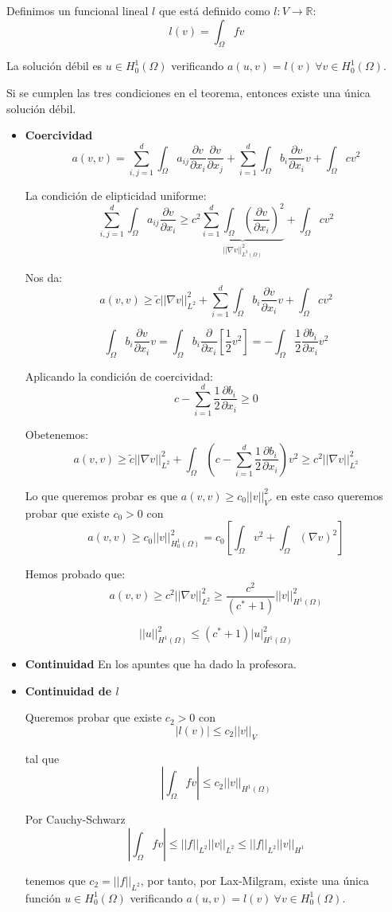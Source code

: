 	Definimos un funcional lineal $l$ que está definido como $l:V\longrightarrow \mathbb{R}$:
	$$l(v) = \int_\Omega fv$$
	
	La solución débil es $u\in H_0^1(\Omega)$ verificando $a(u,v) = l(v) \ \forall v \in H_0^1(\Omega)$.
	
	Si se cumplen las tres condiciones en el teorema, entonces existe una única solución débil.
	
	\begin{itemize}
		\item \textbf{Coercividad}
		$$a(v,v) = \sum_{i,j=1}^d \int_\Omega a_{ij} \frac{\partial v}{\partial x_i} \frac{\partial v}{\partial x_j} + \sum_{i=1}^d\int_\Omega b_i \frac{\partial v}{\partial x_i}v + \int_\Omega cv^2$$
		
		La condición de elipticidad uniforme:
		$$\sum_{i,j=1}^d \int_\Omega a_{ij} \frac{\partial v}{\partial x_i} \ge c^2  \underbrace{\sum_{i=1}^d\int_\Omega (\frac{\partial v}{\partial x_i})^2}_{||\nabla v|| ^2_{L^2(\Omega)}} + \int_\Omega cv^2$$
		
		Nos da:
		$$a(v,v) \ge \tilde{c}||\nabla v||^2_{L^2} + \sum_{i=1}^d \int_{\Omega} b_i\frac{\partial v}{\partial x_i}v + \int_\Omega cv^2$$
		
		$$\int_\Omega b_i\frac{\partial v}{\partial x_i}v = \int_\Omega b_i\frac{\partial }{\partial x_i}\left[\frac{1}{2}v^2\right] = -\int_\Omega \frac{1}{2}\frac{\partial b_i}{\partial x_i} v^2$$
		
		Aplicando la condición de coercividad:
		$$c-\sum_{i=1}^d\frac{1}{2}\frac{\partial b_i}{\partial x_i} \ge 0$$
		
		Obetenemos:
		$$a(v,v) \ge \tilde{c}||\nabla v||^2_{L^2} + \int_\Omega \left(c-\sum_{i=1}^d \frac{1}{2} \frac{\partial b_i}{\partial x_i}\right)v^2 \ge c^2 ||\nabla v||^2_{L^2}$$
		
		Lo que queremos probar es que $a(v,v) \ge c_0 ||v||^2_V$. en este caso queremos probar que existe $c_0>0$ con
		$$a(v,v) \ge c_0 ||v||^2_{H_0^1(\Omega)} = c_0 \left[\int_\Omega v^2 + \int_\Omega (\nabla v)^2\right]$$
		
		Hemos probado que:
		$$a(v,v)\ge c^2 ||\nabla v||^2_{L^2} \ge \frac{c^2}{(c^*+1)}||v||^2_{H^1(\Omega)}$$
		
		$$||u||^2_{H^1(\Omega)}\le (c^*+1)|u|^2_{H^1(\Omega)}$$
		
		\item \textbf{Continuidad}	
		En los apuntes que ha dado la profesora.
		
		\item \textbf{Continuidad de $l$}
		
		Queremos probar que existe $c_2>0$ con
		$$|l(v)| \le c_2||v||_V$$
		
		tal que
		$$|\int_\Omega fv| \le c_2||v||_{H^1(\Omega)}$$
		
		Por Cauchy-Schwarz
		$$|\int_{\Omega} fv| \le ||f||_{L^2} ||v||_{L^2} \le ||f||_{L^2}||v||_{H^1}$$
		
		tenemos que $c_2 = ||f||_{L^2}$, por tanto, por Lax-Milgram, existe una única función $u\in H_0^1(\Omega)$ verificando
		$a(u,v) = l(v) \ \forall v \in H_0^1(\Omega)$.
	\end{itemize}
	
